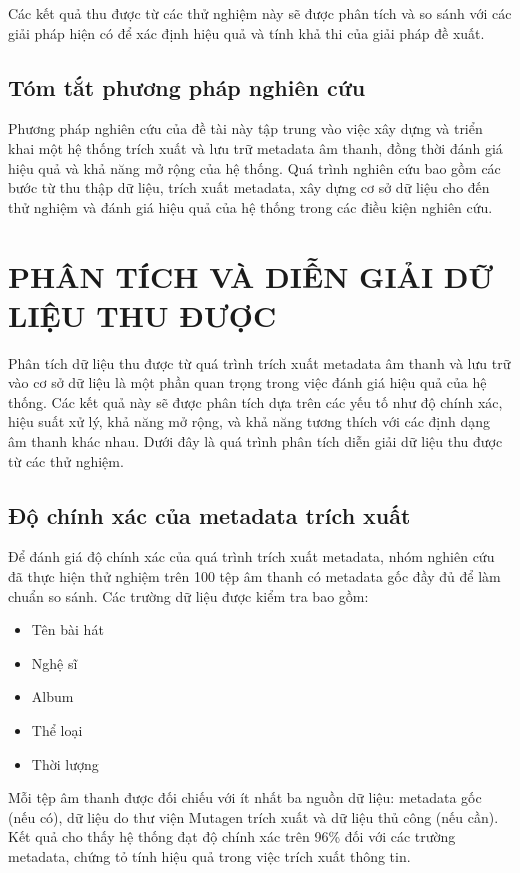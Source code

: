 \documentclass[conference]{IEEEtran}
\begin{document}
Các kết quả thu được từ các thử nghiệm này sẽ được phân tích và so sánh với các giải pháp hiện có để xác định hiệu quả và tính khả thi của giải pháp đề xuất.

\subsection{Tóm tắt phương pháp nghiên cứu}
Phương pháp nghiên cứu của đề tài này tập trung vào việc xây dựng và triển khai một hệ thống trích xuất và lưu trữ metadata âm thanh, đồng thời đánh giá hiệu quả và khả năng mở rộng của hệ thống. Quá trình nghiên cứu bao gồm các bước từ thu thập dữ liệu, trích xuất metadata, xây dựng cơ sở dữ liệu cho đến thử nghiệm và đánh giá hiệu quả của hệ thống trong các điều kiện nghiên cứu.

\section{PHÂN TÍCH VÀ DIỄN GIẢI DỮ LIỆU THU ĐƯỢC}

Phân tích dữ liệu thu được từ quá trình trích xuất metadata âm thanh và lưu trữ vào cơ sở dữ liệu là một phần quan trọng trong việc đánh giá hiệu quả của hệ thống. Các kết quả này sẽ được phân tích dựa trên các yếu tố như độ chính xác, hiệu suất xử lý, khả năng mở rộng, và khả năng tương thích với các định dạng âm thanh khác nhau. Dưới đây là quá trình phân tích diễn giải dữ liệu thu được từ các thử nghiệm.

\subsection{Độ chính xác của metadata trích xuất}
Để đánh giá độ chính xác của quá trình trích xuất metadata, nhóm nghiên cứu đã thực hiện thử nghiệm trên 100 tệp âm thanh có metadata gốc đầy đủ để làm chuẩn so sánh. Các trường dữ liệu được kiểm tra bao gồm:

\begin{itemize}
    \item Tên bài hát
    \item Nghệ sĩ
    \item Album
    \item Thể loại
    \item Thời lượng
\end{itemize}

Mỗi tệp âm thanh được đối chiếu với ít nhất ba nguồn dữ liệu: metadata gốc (nếu có), dữ liệu do thư viện Mutagen trích xuất và dữ liệu thủ công (nếu cần). Kết quả cho thấy hệ thống đạt độ chính xác trên 96\% đối với các trường metadata, chứng tỏ tính hiệu quả trong việc trích xuất thông tin.
\end{document}
